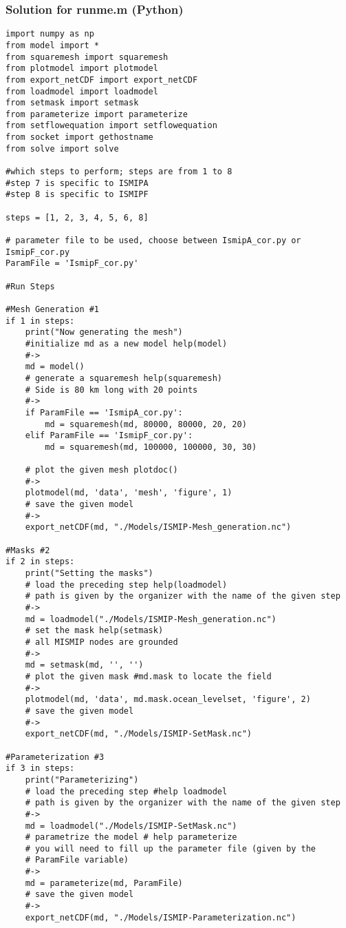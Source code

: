 \subsubsection{Solution for runme.m (Python)}%
\begin{lstlisting}
import numpy as np
from model import *
from squaremesh import squaremesh
from plotmodel import plotmodel
from export_netCDF import export_netCDF
from loadmodel import loadmodel
from setmask import setmask
from parameterize import parameterize
from setflowequation import setflowequation
from socket import gethostname
from solve import solve

#which steps to perform; steps are from 1 to 8
#step 7 is specific to ISMIPA
#step 8 is specific to ISMIPF

steps = [1, 2, 3, 4, 5, 6, 8]

# parameter file to be used, choose between IsmipA_cor.py or IsmipF_cor.py
ParamFile = 'IsmipF_cor.py'

#Run Steps

#Mesh Generation #1
if 1 in steps:
    print("Now generating the mesh")
    #initialize md as a new model help(model)
    #->
    md = model()
    # generate a squaremesh help(squaremesh)
    # Side is 80 km long with 20 points
    #->
    if ParamFile == 'IsmipA_cor.py':
        md = squaremesh(md, 80000, 80000, 20, 20)
    elif ParamFile == 'IsmipF_cor.py':
        md = squaremesh(md, 100000, 100000, 30, 30)

    # plot the given mesh plotdoc()
    #->
    plotmodel(md, 'data', 'mesh', 'figure', 1)
    # save the given model
    #->
    export_netCDF(md, "./Models/ISMIP-Mesh_generation.nc")

#Masks #2
if 2 in steps:
    print("Setting the masks")
    # load the preceding step help(loadmodel)
    # path is given by the organizer with the name of the given step
    #->
    md = loadmodel("./Models/ISMIP-Mesh_generation.nc")
    # set the mask help(setmask)
    # all MISMIP nodes are grounded
    #->
    md = setmask(md, '', '')
    # plot the given mask #md.mask to locate the field
    #->
    plotmodel(md, 'data', md.mask.ocean_levelset, 'figure', 2)
    # save the given model
    #->
    export_netCDF(md, "./Models/ISMIP-SetMask.nc")

#Parameterization #3
if 3 in steps:
    print("Parameterizing")
    # load the preceding step #help loadmodel
    # path is given by the organizer with the name of the given step
    #->
    md = loadmodel("./Models/ISMIP-SetMask.nc")
    # parametrize the model # help parameterize
    # you will need to fill up the parameter file (given by the
    # ParamFile variable)
    #->
    md = parameterize(md, ParamFile)
    # save the given model
    #->
    export_netCDF(md, "./Models/ISMIP-Parameterization.nc")


\end{lstlisting}

